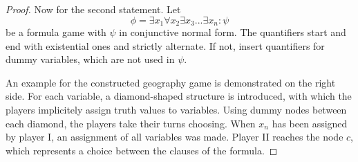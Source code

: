 \documentclass[10pt,fleqn]{article}
\theoremstyle{definition}
\theoremstyle{remark}
\begin{document}
\begin{proof}
    \begin{minipage}{0.5\linewidth}
        Now for the second statement. Let
        \[\phi = \exists x_1 \forall x_2 \exists x_3 ... \exists x_n\colon \psi\]
        be a formula game with \(\psi\) in conjunctive normal form. The quantifiers start and end with existential ones and strictly alternate. If not, insert quantifiers for dummy variables, which are not used in \(\psi\).

        An example for the constructed geography game is demonstrated on the right side. For each variable, a diamond-shaped structure is introduced, with which the players implicitely assign truth values to variables. Using dummy nodes between each diamond, the players take their turns choosing. When \(x_n\) has been assigned by player I, an assignment of all variables was made. Player II reaches the node \(c\), which represents a choice between the clauses of the formula.


\end{minipage}
\end{proof}
\end{document}
